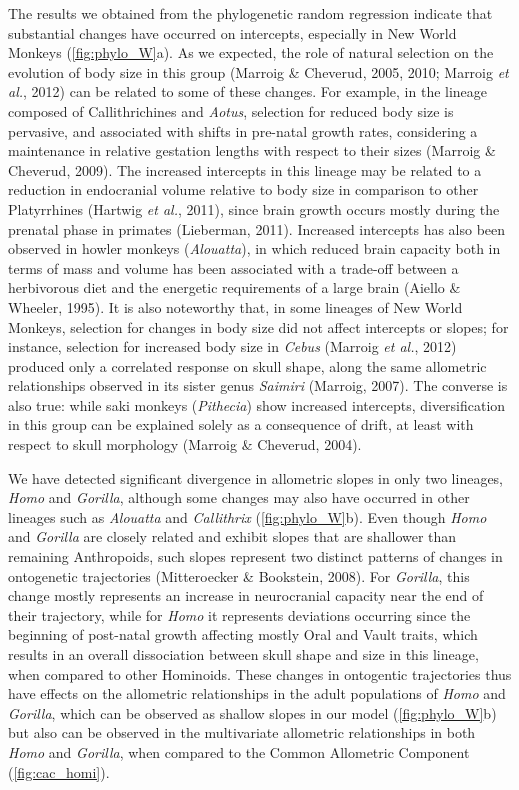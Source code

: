 \documentclass[12pt,twoside]{report}
\begin{document}
The results we obtained from the phylogenetic random regression indicate
that substantial changes have occurred on intercepts, especially in New
World Monkeys (\autoref{fig:phylo_W}a). As we expected, the role of
natural selection on the evolution of body size in this group (Marroig
\& Cheverud, 2005, 2010; Marroig \emph{et al.}, 2012) can be related to
some of these changes. For example, in the lineage composed of
Callithrichines and \emph{Aotus}, selection for reduced body size is
pervasive, and associated with shifts in pre-natal growth rates,
considering a maintenance in relative gestation lengths with respect to
their sizes (Marroig \& Cheverud, 2009). The increased intercepts in
this lineage may be related to a reduction in endocranial volume
relative to body size in comparison to other Platyrrhines (Hartwig
\emph{et al.}, 2011), since brain growth occurs mostly during the
prenatal phase in primates (Lieberman, 2011). Increased intercepts has
also been observed in howler monkeys (\emph{Alouatta}), in which reduced
brain capacity both in terms of mass and volume has been associated with
a trade-off between a herbivorous diet and the energetic requirements of
a large brain (Aiello \& Wheeler, 1995). It is also noteworthy that, in
some lineages of New World Monkeys, selection for changes in body size
did not affect intercepts or slopes; for instance, selection for
increased body size in \emph{Cebus} (Marroig \emph{et al.}, 2012)
produced only a correlated response on skull shape, along the same
allometric relationships observed in its sister genus \emph{Saimiri}
(Marroig, 2007). The converse is also true: while saki monkeys
(\emph{Pithecia}) show increased intercepts, diversification in this
group can be explained solely as a consequence of drift, at least with
respect to skull morphology (Marroig \& Cheverud, 2004).

We have detected significant divergence in allometric slopes in only two
lineages, \emph{Homo} and \emph{Gorilla}, although some changes may also
have occurred in other lineages such as \emph{Alouatta} and
\emph{Callithrix} (\autoref{fig:phylo_W}b). Even though \emph{Homo} and
\emph{Gorilla} are closely related and exhibit slopes that are shallower
than remaining Anthropoids, such slopes represent two distinct patterns
of changes in ontogenetic trajectories (Mitteroecker \& Bookstein,
2008). For \emph{Gorilla}, this change mostly represents an increase in
neurocranial capacity near the end of their trajectory, while for
\emph{Homo} it represents deviations occurring since the beginning of
post-natal growth affecting mostly Oral and Vault traits, which results
in an overall dissociation between skull shape and size in this lineage,
when compared to other Hominoids. These changes in ontogentic
trajectories thus have effects on the allometric relationships in the
adult populations of \emph{Homo} and \emph{Gorilla}, which can be
observed as shallow slopes in our model (\autoref{fig:phylo_W}b) but
also can be observed in the multivariate allometric relationships in
both \emph{Homo} and \emph{Gorilla}, when compared to the Common
Allometric Component (\autoref{fig:cac_homi}).
\end{document}
